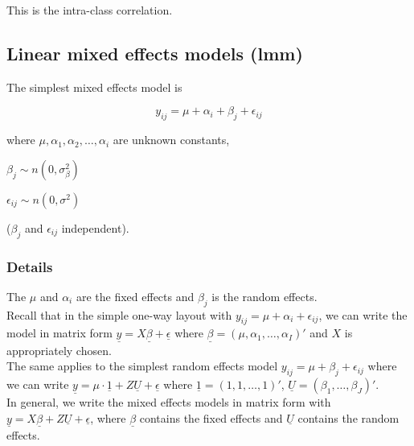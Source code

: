 \documentclass[12pt,a4paper]{article}
\theoremstyle{regla}
\theoremstyle{remark}
\theoremstyle{definition}
\theoremstyle{nonumberbreak}
\begin{document}
This is the intra-class correlation.



\subsection{Linear mixed effects models (lmm)}
\begin{fbox}
\begin{minipage}{0.97\textwidth}
The simplest mixed effects model is

$$y_{ij} = \mu + \alpha_i + \beta_j + \epsilon_{ij}$$

where $\mu, \alpha_1, \alpha_2, \ldots, \alpha_i$ are unknown constants, 

$\beta_j \sim n(0,\sigma^2_\beta)$

$\epsilon_{ij} \sim n(0,\sigma^2)$

($\beta_j$ and $\epsilon_{ij}$ independent).
\end{minipage}
\end{fbox}
\subsubsection{Details}
The $\mu$ and $\alpha_i$ are the fixed effects and $\beta_j$ is the random effects.\\

Recall that in the simple one-way layout with $y_{ij} = \mu + \alpha_i + \epsilon_{ij}$, we can write the model in matrix form
$\underline{y} = X \underline{\beta} + \underline{\epsilon}$ where $\underline{\beta} = (\mu, \alpha_1, \ldots, \alpha_I)'$ and $X$ is appropriately chosen. \\

The same applies to the simplest random effects model $y_{ij}= \mu + \beta_j+ \epsilon_{ij}$ where we can write $\underline{y} = \mu \cdot \underline{1}+ Z \underline{U} + \underline{\epsilon}$ where $\underline{1}=(1,1, \ldots , 1)'$, $\underline{U} = ( \beta_1 , \ldots , \beta_J )'$.\\

In general, we write the mixed effects models in matrix form with $\underline{y} = X \underline{\beta} + Z \underline{U} + \underline {\epsilon}$, where $\underline{\beta}$ contains the fixed effects and $\underline{U}$ contains the random effects.
\end{document}
